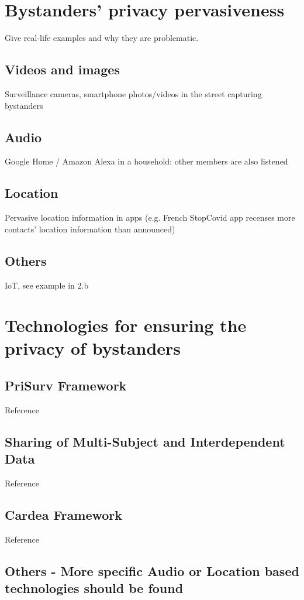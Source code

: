 \documentclass[conference]{ieeetran}
\begin{document}
\section{Bystanders’ privacy pervasiveness}\label{BystandersPrivacy}
Give real-life examples and why they are problematic.
\subsection{Videos and images}
Surveillance cameras, smartphone photos/videos in the street capturing bystanders
\subsection{Audio}
Google Home / Amazon Alexa in a household: other members are also listened
\subsection{Location}
Pervasive location information in apps (e.g. French StopCovid app recenses more contacts’ location information than announced)
\subsection{Others}
IoT, see example in 2.b

\section{Technologies for ensuring the privacy of bystanders}\label{Technologies}

\subsection{PriSurv Framework}
Reference \cite{chinomi2008PriSurv}

\subsection{Sharing of Multi-Subject and Interdependent Data}
Reference \cite{olteanu2018consensual}

\subsection{Cardea Framework}
Reference \cite{shu2016cardea}

\subsection{Others - More specific Audio or Location based technologies should be found}
\end{document}
